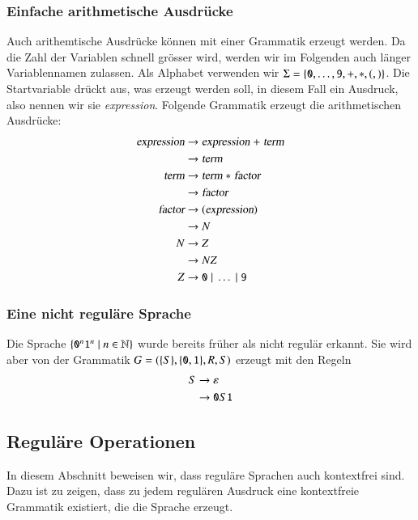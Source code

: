 \subsubsection{Einfache arithmetische Ausdrücke}
%
%
Auch arithemtische Ausdrücke können mit einer
Grammatik erzeugt werden. Da die Zahl der Variablen schnell grösser
wird, werden wir im Folgenden auch länger Variablennamen zulassen.
Als Alphabet verwenden wir
$\Sigma=\{{\tt 0},\dots,{\tt 9},{\tt +},{\tt *},{\tt (}, {\tt )}\}$.
Die Startvariable drückt aus, was erzeugt werden soll, in diesem Fall
ein Ausdruck, also nennen wir sie \textsl{expression}.  Folgende Grammatik
erzeugt die arithmetischen Ausdrücke:
\begin{align*}
\textsl{expression} &\to \textsl{expression}\;{\tt +}\;\textsl{term}\\
                    &\to \textsl{term}\\
\textsl{term}       &\to \textsl{term}\;{\tt *}\;\textsl{factor}\\
                    &\to \textsl{factor}\\
\textsl{factor}     &\to {\tt (}\textsl{expression}{\tt )}\\
                    &\to N\\
N                   &\to Z\\
                    &\to NZ\\
Z                   &\to {\tt 0}\;|\;\dots \;|\;{\tt 9}
\end{align*}

\subsubsection{Eine nicht reguläre Sprache}
Die Sprache $\{{\tt 0}^n{\tt 1}^n\;|\;n\in\mathbb N\}$ wurde bereits
früher als nicht regulär erkannt. Sie wird aber von der 
Grammatik $G=(\{S\}, \{{\tt 0},{\tt 1}\}, R, S)$ erzeugt
mit den Regeln
\begin{align*}
S&\rightarrow \varepsilon\\
&\rightarrow {\tt 0}S{\tt 1}
\end{align*}

\subsection{Reguläre Operationen\label{sect:cfg-regulaer}}
In diesem Abschnitt beweisen wir, dass reguläre Sprachen auch
kontextfrei sind. Dazu ist zu zeigen, dass
zu jedem regulären Ausdruck eine kontextfreie Grammatik existiert,
die die Sprache erzeugt.

